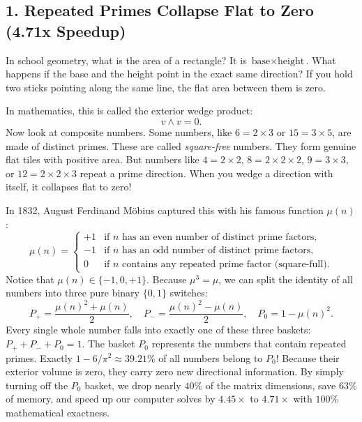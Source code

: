\documentclass[11pt,a4paper]{article}
\theoremstyle{definition}
\begin{document}
\subsection{1. Repeated Primes Collapse Flat to Zero (4.71x Speedup)}
In school geometry, what is the area of a rectangle? It is $\text{base} \times \text{height}$. What happens if the base and the height point in the exact same direction? If you hold two sticks pointing along the same line, the flat area between them is zero.

In mathematics, this is called the exterior wedge product:
\begin{equation}
v \wedge v = 0.
\end{equation}
Now look at composite numbers. Some numbers, like $6 = 2 \times 3$ or $15 = 3 \times 5$, are made of distinct primes. These are called \emph{square-free} numbers. They form genuine flat tiles with positive area. But numbers like $4 = 2 \times 2$, $8 = 2 \times 2 \times 2$, $9 = 3 \times 3$, or $12 = 2 \times 2 \times 3$ repeat a prime direction. When you wedge a direction with itself, it collapses flat to zero!

In 1832, August Ferdinand M{\"o}bius captured this with his famous function $\mu(n)$:
\begin{equation}
\mu(n) = \begin{cases} +1 & \text{if } n \text{ has an even number of distinct prime factors}, \\ -1 & \text{if } n \text{ has an odd number of distinct prime factors}, \\ 0 & \text{if } n \text{ contains any repeated prime factor (square-full)}. \end{cases}
\end{equation}
Notice that $\mu(n) \in \{-1, 0, +1\}$. Because $\mu^3 = \mu$, we can split the identity of all numbers into three pure binary $\{0, 1\}$ switches:
\begin{equation}
P_+ = \frac{\mu(n)^2 + \mu(n)}{2}, \quad P_- = \frac{\mu(n)^2 - \mu(n)}{2}, \quad P_0 = 1 - \mu(n)^2.
\end{equation}
Every single whole number falls into exactly one of these three baskets: $P_+ + P_- + P_0 = 1$. The basket $P_0$ represents the numbers that contain repeated primes. Exactly $1 - 6/\pi^2 \approx 39.21\%$ of all numbers belong to $P_0$! Because their exterior volume is zero, they carry zero new directional information. By simply turning off the $P_0$ basket, we drop nearly $40\%$ of the matrix dimensions, save $63\%$ of memory, and speed up our computer solves by $4.45\times$ to $4.71\times$ with $100\%$ mathematical exactness.
\end{document}
